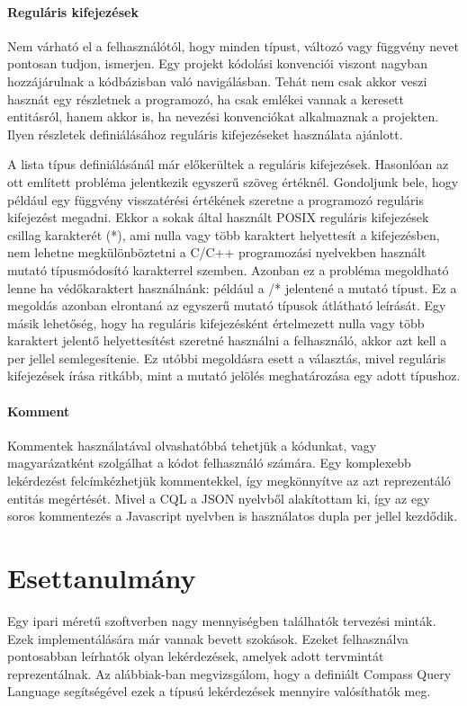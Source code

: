 \documentclass[a4paper,12pt]{report}
\begin{document}
\subsubsection{Reguláris kifejezések}
Nem várható el a felhasználótól, hogy minden típust, változó vagy függvény nevet pontosan tudjon, ismerjen. Egy projekt kódolási konvenciói viszont nagyban hozzájárulnak a kódbázisban való navigálásban. Tehát nem csak akkor veszi hasznát egy részletnek a programozó, ha csak emlékei vannak a keresett entitásról, hanem akkor is, ha nevezési konvenciókat alkalmaznak a projekten. Ilyen részletek definiálásához reguláris kifejezéseket használata ajánlott.
\par A lista típus definiálásánál már előkerültek a reguláris kifejezések. Hasonlóan az ott említett probléma jelentkezik egyszerű szöveg értéknél. Gondoljunk bele, hogy például egy függvény visszatérési értékének szeretne a programozó reguláris kifejezést megadni. Ekkor a sokak által használt POSIX reguláris kifejezések csillag karakterét (*), ami nulla vagy több karaktert helyettesít a kifejezésben, nem lehetne megkülönböztetni a C/C++ programozási nyelvekben használt mutató típusmódosító karakterrel szemben. Azonban ez a probléma megoldható lenne ha védőkaraktert használnánk: például a /* jelentené a mutató típust. Ez a megoldás azonban elrontaná az egyszerű mutató típusok átlátható leírását. Egy másik lehetőség, hogy ha reguláris kifejezésként értelmezett nulla vagy több karaktert jelentő helyettesítést szeretné használni a felhasználó, akkor azt kell a per jellel semlegesítenie. Ez utóbbi megoldásra esett a választás, mivel reguláris kifejezések írása ritkább, mint a mutató jelölés meghatározása egy adott típushoz.
\subsubsection{Komment}
Kommentek használatával olvashatóbbá tehetjük a kódunkat, vagy magyarázatként szolgálhat a kódot felhasználó számára. Egy komplexebb lekérdezést felcímkézhetjük kommentekkel, így megkönnyítve az azt reprezentáló entitás megértését. Mivel a CQL a JSON nyelvből alakítottam ki, így az egy soros kommentezés a Javascript nyelvben is használatos dupla per jellel kezdődik.

\chapter{Esettanulmány}
Egy ipari méretű szoftverben nagy mennyiségben találhatók tervezési minták. Ezek implementálására már vannak bevett szokások. Ezeket felhasználva pontosabban leírhatók olyan lekérdezések, amelyek adott tervmintát reprezentálnak. Az alábbiak-ban megvizsgálom, hogy a definiált Compass Query Language segítségével ezek a típusú lekérdezések mennyire valósíthatók meg.
\end{document}
